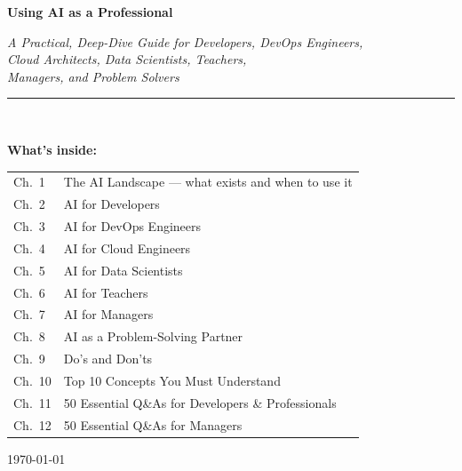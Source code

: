 \documentclass[12pt,a4paper]{report}
\begin{document}
\begin{titlepage}
  \centering
  \vspace*{3cm}
  {\Huge\bfseries\color{chapterblue} Using AI as a Professional\par}
  \vspace{0.8cm}
  {\large\itshape
    A Practical, Deep-Dive Guide for Developers, DevOps Engineers,\\[0.3em]
    Cloud Architects, Data Scientists, Teachers,\\[0.3em]
    Managers, and Problem Solvers\par}
  \vspace{2cm}
  {\color{chapterblue}\rule{0.55\linewidth}{1.5pt}}\\[1cm]
  {\normalsize
    \textbf{What's inside:}\\[0.6em]
    \begin{tabular}{ll}
      Ch.~1  & The AI Landscape --- what exists and when to use it \\
      Ch.~2  & AI for Developers \\
      Ch.~3  & AI for DevOps Engineers \\
      Ch.~4  & AI for Cloud Engineers \\
      Ch.~5  & AI for Data Scientists \\
      Ch.~6  & AI for Teachers \\
      Ch.~7  & AI for Managers \\
      Ch.~8  & AI as a Problem-Solving Partner \\
      Ch.~9  & Do's and Don'ts \\
      Ch.~10 & Top 10 Concepts You Must Understand \\
      Ch.~11 & 50 Essential Q\&As for Developers \& Professionals \\
      Ch.~12 & 50 Essential Q\&As for Managers \\
    \end{tabular}\par}
  \vfill
  {\large\today\par}
\end{titlepage}

\tableofcontents
\clearpage













\end{document}
